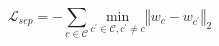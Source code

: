 \begin{equation}
\label{eq:separation-loss}
{\mathcal{L}}_{sep}=-\sum _{c\in \mathcal{C}}\underset{{c}^{\prime }\in \mathcal{C},{c}^{\prime }\ne c}{\mathrm{min}}{\left\Vert {w}_{c}-{w}_{{c}^{\prime }}\right\Vert }_{2}
\end{equation}
